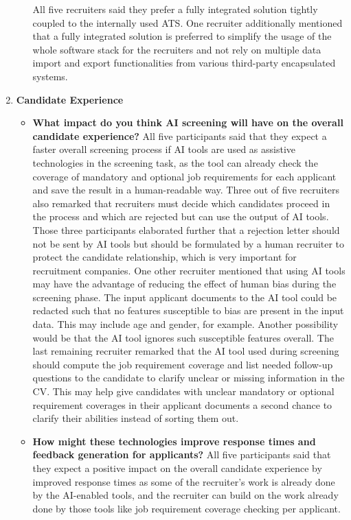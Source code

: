 \documentclass[draft,final]{thesisclass} %
\begin{document}
\begin{enumerate}
\begin{itemize}
        All five recruiters said they prefer a fully integrated solution tightly coupled to the internally used \acs{ATS}.
        One recruiter additionally mentioned that a fully integrated solution is preferred to simplify the usage of the whole software stack for the recruiters and not rely on multiple data import and export functionalities from various third-party encapsulated systems.
    \end{itemize}
    \item \textbf{Candidate Experience} \label{candidate_experience}
    \begin{itemize}
        \item \textbf{What impact do you think \acs{AI} screening will have on the overall candidate experience?}
        All five participants said that they expect a faster overall screening process if \acs{AI} tools are used as assistive technologies in the screening task, as the tool can already check the coverage of mandatory and optional job requirements for each applicant and save the result in a human-readable way. Three out of five recruiters also remarked that recruiters must decide which candidates proceed in the process and which are rejected but can use the output of \acs{AI} tools. Those three participants elaborated further that a rejection letter should not be sent by \acs{AI} tools but should be formulated by a human recruiter to protect the candidate relationship, which is very important for recruitment companies. One other recruiter mentioned that using \acs{AI} tools may have the advantage of reducing the effect of human bias during the screening phase. The input applicant documents to the \acs{AI} tool could be redacted such that no features susceptible to bias are present in the input data. This may include age and gender, for example. Another possibility would be that the \acs{AI} tool ignores such susceptible features overall. The last remaining recruiter remarked that the \acs{AI} tool used during screening should compute the job requirement coverage and list needed follow-up questions to the candidate to clarify unclear or missing information in the \acs{CV}. This may help give candidates with unclear mandatory or optional requirement coverages in their applicant documents a second chance to clarify their abilities instead of sorting them out.
        \item \textbf{How might these technologies improve response times and feedback generation for applicants?}
        All five participants said that they expect a positive impact on the overall candidate experience by improved response times as some of the recruiter's work is already done by the \acs{AI}-enabled tools, and the recruiter can build on the work already done by those tools like job requirement coverage checking per applicant.

\end{itemize}
\end{enumerate}
\end{document}
